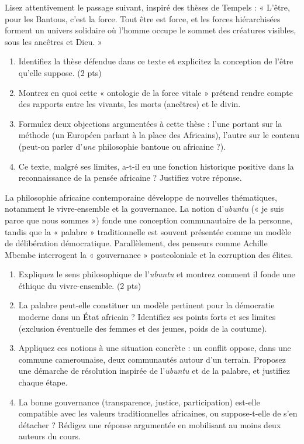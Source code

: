 \documentclass[11pt]{article}
\begin{document}
\begin{exercice}
Lisez attentivement le passage suivant, inspiré des thèses de Tempels : « L'être, pour les Bantous, c'est la force. Tout être est force, et les forces hiérarchisées forment un univers solidaire où l'homme occupe le sommet des créatures visibles, sous les ancêtres et Dieu. »
\begin{enumerate}
\item Identifiez la thèse défendue dans ce texte et explicitez la conception de l'être qu'elle suppose. (2 pts)
\item Montrez en quoi cette « ontologie de la force vitale » prétend rendre compte des rapports entre les vivants, les morts (ancêtres) et le divin.
\item Formulez deux objections argumentées à cette thèse : l'une portant sur la méthode (un Européen parlant à la place des Africains), l'autre sur le contenu (peut-on parler d'\emph{une} philosophie bantoue ou africaine ?).
\item Ce texte, malgré ses limites, a-t-il eu une fonction historique positive dans la reconnaissance de la pensée africaine ? Justifiez votre réponse.
\end{enumerate}
\end{exercice}

\begin{exercice}
La philosophie africaine contemporaine développe de nouvelles thématiques, notamment le vivre-ensemble et la gouvernance. La notion d'\emph{ubuntu} (« je suis parce que nous sommes ») fonde une conception communautaire de la personne, tandis que la « palabre » traditionnelle est souvent présentée comme un modèle de délibération démocratique. Parallèlement, des penseurs comme Achille Mbembe interrogent la « gouvernance » postcoloniale et la corruption des élites.
\begin{enumerate}
\item Expliquez le sens philosophique de l'\emph{ubuntu} et montrez comment il fonde une éthique du vivre-ensemble. (2 pts)
\item La palabre peut-elle constituer un modèle pertinent pour la démocratie moderne dans un État africain ? Identifiez ses points forts et ses limites (exclusion éventuelle des femmes et des jeunes, poids de la coutume).
\item Appliquez ces notions à une situation concrète : un conflit oppose, dans une commune camerounaise, deux communautés autour d'un terrain. Proposez une démarche de résolution inspirée de l'\emph{ubuntu} et de la palabre, et justifiez chaque étape.
\item La bonne gouvernance (transparence, justice, participation) est-elle compatible avec les valeurs traditionnelles africaines, ou suppose-t-elle de s'en détacher ? Rédigez une réponse argumentée en mobilisant au moins deux auteurs du cours.
\end{enumerate}
\end{exercice}
\end{document}
